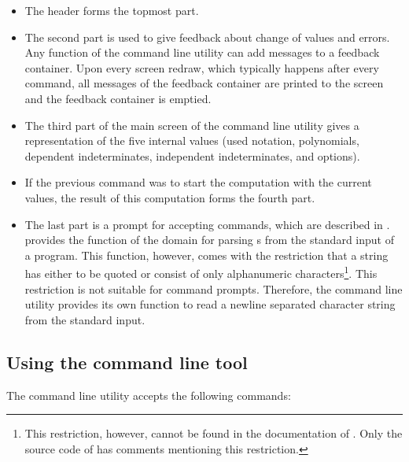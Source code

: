 \begin{itemize}
\item The header forms the topmost part.
\item The second part is used to give feedback about change of values and errors. Any function of the command line utility can add messages to a feedback container. Upon every screen redraw, which typically happens after every command, all messages of the feedback container are printed to the screen and the feedback container is emptied.
\item The third part of the main screen of the command line utility gives a representation of the five internal values (used notation, polynomials, dependent indeterminates, independent indeterminates, and options). 
\item If the previous command was to start the computation with the current values, the result of this computation forms the fourth part. 
\item The last part is a prompt for accepting commands, which are described in . \LibAldor provides the function \adname[String]{<<} of the domain  for parsing s from the standard input of a program. This function, however, comes with the restriction that a string has either to be quoted or consist of only alphanumeric characters\footnote{This restriction, however, cannot be found in the documentation of . Only the source code of  has comments mentioning this restriction.}. This restriction is not suitable for command prompts. Therefore, the command line utility provides its own function to read a newline separated character string from the standard input.

\end{itemize}

\subsection{Using the command line tool}

The command line utility accepts the following commands:

